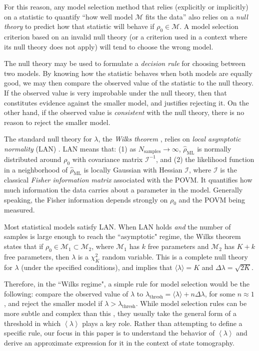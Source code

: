\documentclass[aps,pra, twocolumn]{revtex4-1}
\newcommand{\M}{\mathcal{M}}
\newcommand{\expect}[1]{\ensuremath{\left\langle#1\right\rangle}}
\newcommand{\Fi}{\mathcal{I}}
\newcommand{\rhohat}{\hat{\rho}}
\begin{document}
For this reason, any model selection method that relies (explicitly or implicitly) on a statistic to quantify ``how well model $\M$ fits the data'' also relies on a \emph{null theory} to predict how that statistic will behave if $\rho_{0} \in \M$.  A model selection criterion based on an invalid null theory (or a criterion used in a context where its null theory does not apply) will tend to choose the wrong model.

The null theory may be used to formulate a \emph{decision rule} for choosing between two models. By knowing how the statistic behaves when both models are equally good, we may then compare the observed value of the statistic to the null theory. If the observed value is very improbable under the null theory, then that constitutes evidence against the smaller model, and justifies rejecting it. On the other hand, if the observed value is \emph{consistent} with the null theory, there is no reason to reject the smaller model.

The standard null theory for $\lambda$, the \emph{Wilks theorem} \cite{Wilks1938}, relies on \emph{local asymptotic normality} (LAN) \cite{LeCam1970, LeCam1956}. LAN means that: (1) as $N_{\mathrm{samples}}\rightarrow \infty$,  $\rhohat_{\mathrm{ML}}$ is normally distributed around $\rho_{0}$ with covariance matrix $\Fi^{-1}$, and (2) the likelihood function in a neighborhood of $\rhohat_{\mathrm{ML}}$ is locally Gaussian with Hessian $\Fi$, where $\Fi$ is the classical \emph{Fisher information matrix} associated with the POVM. It quantifies how much information the data carries about a parameter in the model. Generally speaking, the Fisher information depends strongly on $\rho_{0}$ and the POVM being measured.

Most statistical models satisfy LAN.  When LAN holds \emph{and} the number of samples is large enough to reach the ``asymptotic" regime, the Wilks theorem states that if $\rho_{0}\in \M_{1}\subset \M_{2}$, where $\M_{1}$ has $k$ free parameters and $\M_{2}$ has $K+k$ free parameters, then $\lambda$ is a $\chi^{2}_{K}$ random variable.  This is a complete null theory for $\lambda$ (under the specified conditions), and implies that $\langle \lambda \rangle = K$ and $\Delta \lambda = \sqrt{2K}$.

Therefore, in the ``Wilks regime", a simple rule for model selection would be the following: compare the observed value of $\lambda$ to $\lambda_{\mathrm{thresh}} = \langle \lambda \rangle + n\Delta \lambda$, for some $n \approx 1$, and reject the smaller model if $\lambda > \lambda_{\mathrm{thresh}}$.  While model selection rules can be more subtle and complex than this , they usually take the general form of a threshold in which $\expect{\lambda}$ plays a key role.  Rather than attempting to define a specific rule, our focus in this paper is to understand the behavior of $\expect{\lambda}$ and derive an approximate expression for it in the context of state tomography.
\end{document}
